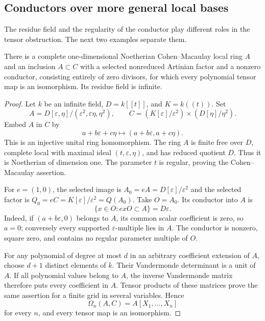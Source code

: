 \subsection{Conductors over more general local bases}

The residue field and the regularity of the conductor play different
roles in the tensor obstruction.  The next two examples separate them.

\begin{proposition}\label{prop:infinite-residue-nilpotent-conductor}
There is a complete one-dimensional Noetherian Cohen--Macaulay local
ring $A$ and an inclusion $A\subset C$ with a selected nonreduced
Artinian factor and a nonzero conductor, consisting entirely of
zero divisors, for which every polynomial tensor map is an
isomorphism.  Its residue field is infinite.
\end{proposition}
\begin{proof}
Let $k$ be an infinite field, $D=k[[t]]$, and $K=k((t))$.  Set
\[
 A=D[\varepsilon,\eta]/(\varepsilon^2,\varepsilon\eta,\eta^2),
 \qquad
 C=(K[\varepsilon]/\varepsilon^2)
       \times(D[\eta]/\eta^2).
\]
Embed $A$ in $C$ by
\[
 a+b\varepsilon+c\eta\longmapsto
             (a+b\varepsilon,a+c\eta).
\]
This is an injective unital ring homomorphism.  The ring $A$ is
finite free over $D$, complete local with maximal ideal
$(t,\varepsilon,\eta)$, and has reduced quotient $D$.
Thus it is Noetherian of dimension one.  The parameter $t$ is
regular, proving the Cohen--Macaulay assertion.

For $e=(1,0)$, the selected image is
$A_0=eA=D[\varepsilon]/\varepsilon^2$ and the selected factor is
$Q_0=eC=K[\varepsilon]/\varepsilon^2=Q(A_0)$.
Take $O=A_0$.  Its conductor into $A$ is
\[
 \{x\in O:exO\subset A\}=D\varepsilon.
\]
Indeed, if $(a+b\varepsilon,0)$ belongs to $A$, its common scalar
coefficient is zero, so $a=0$; conversely every supported
$\varepsilon$-multiple lies in $A$.  The conductor is nonzero,
square zero, and contains no regular parameter multiple of $O$.

For any polynomial of degree at most $d$ in an arbitrary coefficient
extension of $A$, choose $d+1$ distinct elements of $k$.  Their
Vandermonde determinant is a unit of $A$.  If all polynomial values
belong to $A$, the inverse Vandermonde matrix therefore puts every
coefficient in $A$.  Tensor products of these matrices prove the
same assertion for a finite grid in several variables.  Hence
\[
 \Omega_n(A,C)=A[X_1,\ldots,X_n]
\]
for every $n$, and every tensor map is an isomorphism.
\end{proof}

